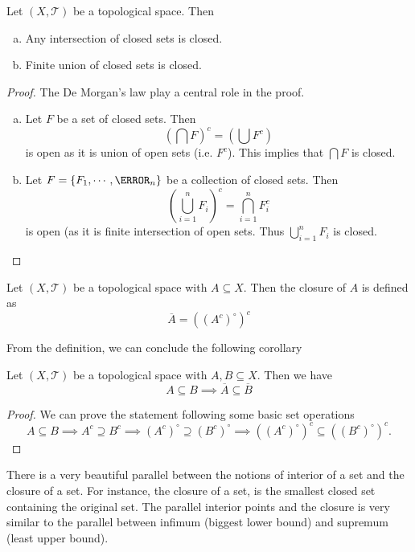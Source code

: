 \begin{proposition}
	Let $(X,\mathcal{T})$ be a topological space. Then 
	\begin{enumerate}[(a)]
		\item Any intersection of closed sets is closed.
		\item Finite union of closed sets is closed.
	\end{enumerate}
\end{proposition}
\begin{proof}
	The De Morgan's law play a central role in the proof.
	\begin{enumerate}[(a)]
		\item Let $F$ be a set of closed sets. Then 
		\[ (\bigcap F)^c = (\bigcup F^c) \]
		is open as it is union of open sets (i.e. $F^c$). This implies that $\bigcap F$ is closed. 
		\item Let $F = \{F_1, \cdots, \F_n\}$ be a collection of closed sets. Then 
		\[ (\bigcup_{i=1}^{n} F_i)^c = \bigcap_{i=1}^n F_i^c \]
		is open (as it is finite intersection of open sets. Thus $\bigcup_{i=1}^{n} F_i$ is closed.
	\end{enumerate}
\end{proof}

\begin{definition}
	Let $(X,\mathcal{T})$ be a topological space with $A \subseteq X$. Then the closure of $A$ is defined as
	\[ \overline{A} = ((A^c)^\circ)^c \]
\end{definition}

From the definition, we can conclude the following corollary
\begin{corollary}
	Let $(X,\mathcal{T})$ be a topological space with $A,B \subseteq X$. Then we have
	\[ A \subseteq B \implies \overline{A} \subseteq \overline{B} \]
\end{corollary}
\begin{proof}
	We can prove the statement following some basic set operations
	\[ A \subseteq B \implies A^c \supseteq B^c \implies (A^c)^\circ \supseteq (B^c)^\circ \implies ((A^c)^\circ)^c \subseteq ((B^c)^\circ)^c. \]
\end{proof}

There is a very beautiful parallel between the notions of interior of a set and the closure of a set. For instance, the closure of a set, is the smallest closed set containing the original set. The parallel interior points and the closure is very similar to the parallel between infimum (biggest lower bound) and supremum (least upper bound).

